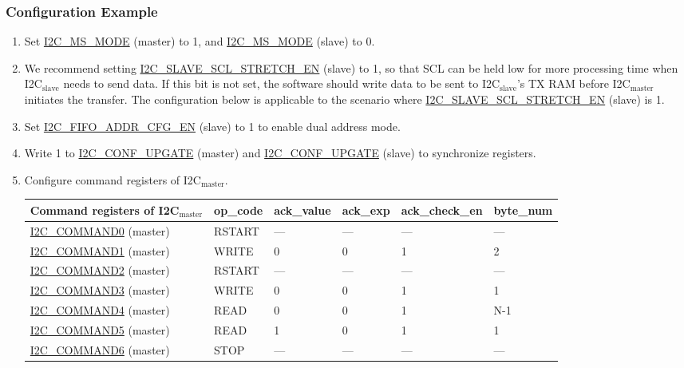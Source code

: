 \documentclass[main\_\_EN.tex]{subfiles}
\begin{document}
\subsubsection{Configuration Example}
\begin{enumerate}
\item Set \hyperref[fielddesc:I2CMSMODE]{I2C\_MS\_MODE} (master) to 1, and \hyperref[fielddesc:I2CMSMODE]{I2C\_MS\_MODE} (slave) to 0.
\item We recommend setting \hyperref[fielddesc:I2CSLAVESCLSTRETCHEN]{I2C\_SLAVE\_SCL\_STRETCH\_EN} (slave) to 1, so that SCL can be held low for more processing time when I2C$_\text{slave}$ needs to send data. If this bit is not set, the software should write data to be sent to I2C$_\text{slave}$'s TX RAM before I2C$_\text{master}$ initiates the transfer. The configuration below is applicable to the scenario where \hyperref[fielddesc:I2CSLAVESCLSTRETCHEN]{I2C\_SLAVE\_SCL\_STRETCH\_EN} (slave) is 1.
\item Set \hyperref[fielddesc:I2CFIFOADDRCFGEN]{I2C\_FIFO\_ADDR\_CFG\_EN} (slave) to 1 to enable dual address mode.
\item Write 1 to \hyperref[fielddesc:I2CCONFUPGATE]{I2C\_CONF\_UPGATE} (master) and \hyperref[fielddesc:I2CCONFUPGATE]{I2C\_CONF\_UPGATE} (slave) to synchronize registers.
\item Configure command registers of I2C$_\text{master}$.
\begin{longtable}{ | p{4cm} | p{2cm} | p{2cm} | p{2cm} |p{2cm} | p{2cm} |}
\hline\rowcolor{lightgray}
Command registers of I2C$_\text{master}$& op\_code & ack\_value&ack\_exp&ack\_check\_en&byte\_num  \\ \hline
\hyperref[fielddesc:I2CCOMMAND0]{I2C\_COMMAND0} (master)& RSTART& ---&---&---&---  \\ \hline
\hyperref[fielddesc:I2CCOMMAND1]{I2C\_COMMAND1} (master)& WRITE& 0&0&1&2  \\ \hline
\hyperref[fielddesc:I2CCOMMAND2]{I2C\_COMMAND2} (master)& RSTART& ---&---&---&---  \\ \hline
\hyperref[fielddesc:I2CCOMMAND3]{I2C\_COMMAND3} (master)& WRITE& 0&0&1&1  \\ \hline
\hyperref[fielddesc:I2CCOMMAND4]{I2C\_COMMAND4} (master)& READ& 0&0&1&N-1  \\ \hline
\hyperref[fielddesc:I2CCOMMAND5]{I2C\_COMMAND5} (master)& READ& 1&0&1&1  \\ \hline
\hyperref[fielddesc:I2CCOMMAND6]{I2C\_COMMAND6} (master)& STOP& ---&---&---&---  \\ \hline
\end{longtable}


\end{enumerate}
\end{document}
